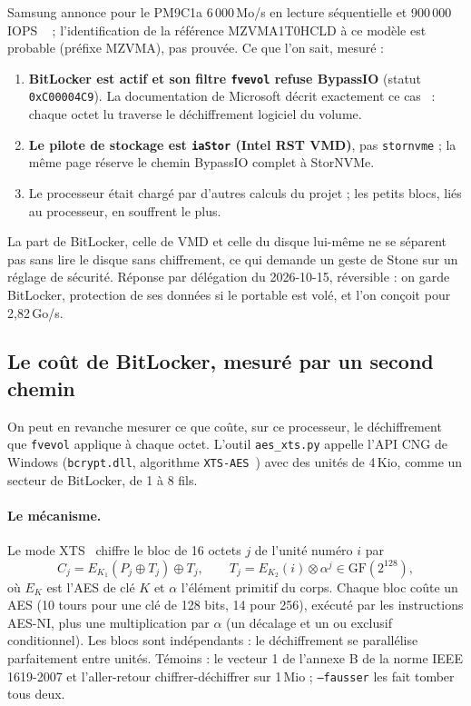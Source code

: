 Samsung annonce pour le PM9C1a 6\,000\,Mo/s en lecture séquentielle et 900\,000 IOPS \litt~\cite{samsung2023pm9c1a,storagereview2023pm9c1a} ; l'identification de la référence MZVMA1T0HCLD à ce modèle est probable (préfixe MZVMA), pas prouvée. Ce que l'on sait, mesuré :
\begin{enumerate}
\item \textbf{BitLocker est actif et son filtre \texttt{fvevol} refuse BypassIO} (statut \texttt{0xC00004C9}). La documentation de Microsoft décrit exactement ce cas~\cite{microsoft2025bypassio} : chaque octet lu traverse le déchiffrement logiciel du volume.
\item \textbf{Le pilote de stockage est \texttt{iaStor} (Intel RST VMD)}, pas \texttt{stornvme} ; la même page réserve le chemin BypassIO complet à StorNVMe.
\item Le processeur était chargé par d'autres calculs du projet ; les petits blocs, liés au processeur, en souffrent le plus.
\end{enumerate}
La part de BitLocker, celle de VMD et celle du disque lui-même ne se séparent pas sans lire le disque sans chiffrement, ce qui demande un geste de Stone sur un réglage de sécurité. Réponse par délégation du 2026-10-15, réversible : on garde BitLocker, protection de ses données si le portable est volé, et l'on conçoit pour 2,82\,Go/s.

\subsection{Le coût de BitLocker, mesuré par un second chemin}\label{sec:bitlocker}

On peut en revanche mesurer ce que coûte, sur ce processeur, le déchiffrement que \texttt{fvevol} applique à chaque octet. L'outil \texttt{aes\_xts.py} appelle l'API CNG de Windows (\texttt{bcrypt.dll}, algorithme \texttt{XTS-AES}~\cite{microsoft2026cngalg}) avec des unités de 4\,Kio, comme un secteur de BitLocker, de 1 à 8 fils.

\paragraph{Le mécanisme.} Le mode XTS~\cite{ieee2008xts} chiffre le bloc de 16 octets $j$ de l'unité numéro $i$ par
\begin{equation}\label{eq:xts}
C_j = E_{K_1}(P_j \oplus T_j) \oplus T_j, \qquad T_j = E_{K_2}(i) \otimes \alpha^{j} \in \mathrm{GF}(2^{128}),
\end{equation}
où $E_K$ est l'AES de clé $K$ et $\alpha$ l'élément primitif du corps. Chaque bloc coûte un AES (10 tours pour une clé de 128 bits, 14 pour 256), exécuté par les instructions AES-NI, plus une multiplication par $\alpha$ (un décalage et un ou exclusif conditionnel). Les blocs sont indépendants : le déchiffrement se parallélise parfaitement entre unités. Témoins : le vecteur 1 de l'annexe B de la norme IEEE 1619-2007 et l'aller-retour chiffrer-déchiffrer sur 1\,Mio ; \texttt{--fausser} les fait tomber tous deux.

